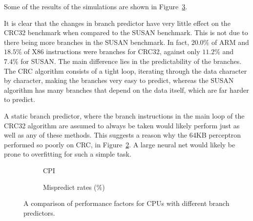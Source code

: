 Some of the results of the simulations are shown in Figure~\ref{fig:partd-factors}.

It is clear that the changes in branch predictor have very little effect on the CRC32
benchmark when compared to the SUSAN benchmark. This is not due to there being more
branches in the SUSAN benchmark. In fact, \(20.0\%\) of ARM and \(18.5\%\) of X86
instructions were branches for CRC32, against only \(11.2\%\) and \(7.4\%\) for SUSAN.
The main difference lies in the predictability of the branches.
The CRC algorithm
consists of a tight loop, iterating through the data character by character,
making the branches very easy to predict, whereas the SUSAN algorithm has
many branches that depend on the data itself, which are far harder to predict.

A static branch predictor, where the branch instructions in the main loop of the CRC32
algorithm are assumed to always be taken would likely perform just as well as any of
these methods. This suggests a reason why the 64KB perceptron performed so poorly on
CRC, in Figure~\ref{fig:partd-mispredict}.
A large neural net would likely be prone to overfitting for such a simple task.

%
%
%
%
%

\begin{figure}[b!]%
\begin{subfigure}{.5\textwidth}
    \centering
    
    \caption{CPI}
    \label{fig:partd-cpi}
\end{subfigure}%
\begin{subfigure}{.5\textwidth}
    \centering
    
    \caption{Mispredict rates (\%)}
    \label{fig:partd-mispredict}
\end{subfigure}%
\caption{A comparison of performance factors for CPUs with different branch predictors.}
\label{fig:partd-factors}
\end{figure}

